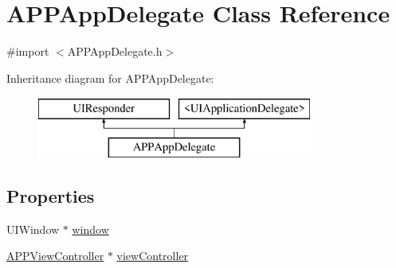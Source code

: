 \hypertarget{interface_a_p_p_app_delegate}{\section{A\+P\+P\+App\+Delegate Class Reference}
\label{interface_a_p_p_app_delegate}
}


{\ttfamily \#import $<$A\+P\+P\+App\+Delegate.\+h$>$}

Inheritance diagram for A\+P\+P\+App\+Delegate\+:\begin{figure}[H]
\begin{center}
\leavevmode
\includegraphics[height=2.000000cm]{dd/d31/interface_a_p_p_app_delegate}
\end{center}
\end{figure}
\subsection*{Properties}
\begin{DoxyCompactItemize}
\item 
U\+I\+Window $\ast$ \hyperlink{interface_a_p_p_app_delegate_a4b8f6d91c1115b02d85644fff0f447c7}{window}
\item 
\hyperlink{interface_a_p_p_view_controller}{A\+P\+P\+View\+Controller} $\ast$ \hyperlink{interface_a_p_p_app_delegate_a4c52917da489f30f98d31b4aae72a3cf}{view\+Controller}
\end{DoxyCompactItemize}


